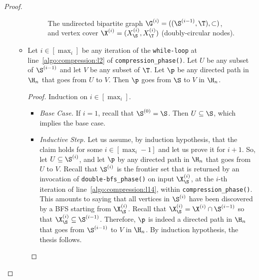 \begin{proof}
\begin{enumerate}
\begin{itemize}
\begin{figure}[!htb]
    \caption{The undirected bipartite graph $\G^{(i)}=((\S^{(i-1)},\T), \subset)$, 
	and vertex cover $\X^{(i)}=(X^{(i)}_\S, X^{(i)}_\T)$ (doubly-circular nodes).}
\label{fig:undirected_bipartite_vertex_cover}
\end{figure}

\item[] \begin{lemma}\label{lemma:inv:2}
Let $i\in[\max_i]$ be any iteration of the \texttt{while-loop} at line~\ref{algo:compression:l2} of \texttt{compression\_phase()}.
Let $U$ be any subset of $\S^{(i-1)}$ and let $V$ be any subset of $\T$. Let $\p$ be any directed path in $\H_n$ that goes from $U$ to $V$.
Then $\p$ goes from $\S$ to $V$ in $\H_n$.
\end{lemma}
\begin{proof}
Induction on $i\in[\max_i]$.
\begin{itemize}
\item \emph{Base Case.} If $i=1$, recall that $\S^{(0)}=\S$. Then $U\subseteq \S$, which  implies the base case.
\item \emph{Inductive Step.}
Let us assume, by induction hypothesis, that the claim holds for some $i\in[\max_i-1]$
and let us prove it for $i+1$.
So, let $U\subseteq \S^{(i)}$, and let $\p$ by any directed path
in $\H_n$ that goes from $U$ to $V$.
Recall that $\S^{(i)}$ is the frontier set that
is returned by an invocation of \texttt{double-bfs\_phase()}
on input $\X^{(i)}_\S$, at the $i$-th iteration of line~\ref{algo:compression:l14}, within \texttt{compression\_phase()}.
This amounts to saying that all vertices in $\S^{(i)}$ have been discovered by a BFS starting from $\X^{(i)}_\S$.
Recall that $\X_\S^{(i)}=\X^{(i)}\cap\S^{(i-1)}$ so that $\X_\S^{(i)}\subseteq \S^{(i-1)}$.
Therefore, $\p$ is indeed a directed path in $\H_n$ that goes from $\S^{(i-1)}$ to $V$ in $\H_n$.
By induction hypothesis, the thesis follows.
\end{itemize}
\end{proof}


\end{itemize}
\end{enumerate}
\end{proof}
